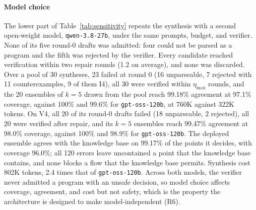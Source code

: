\documentclass[final,5p]{elsarticle}
\begin{document}
\paragraph{Model choice}
The lower part of Table~\ref{tab:sensitivity} repeats the synthesis with a second open-weight model, \texttt{qwen-3.8-27b}, under the same prompts, budget, and verifier. None of its five round-0 drafts was admitted: four could not be parsed as a program and the fifth was rejected by the verifier. Every candidate reached verification within two repair rounds (1.2 on average), and none was discarded. Over a pool of 30 syntheses, 23 failed at round 0 (16 unparseable, 7 rejected with 11 counterexamples, 9 of them I4), all 30 were verified within $\eta_{\max}$ rounds, and the 20 ensembles of $k=5$ drawn from the pool reach 99.18\% agreement at 97.1\% coverage, against 100\% and 99.6\% for \texttt{gpt-oss-120b}, at 760K against 322K tokens. On V4, all 20 of its round-0 drafts failed (18 unparseable, 2 rejected), all 20 were verified after repair, and its $k=5$ ensembles reach 99.47\% agreement at 98.0\% coverage, against 100\% and 98.9\% for \texttt{gpt-oss-120b}. The deployed ensemble agrees with the knowledge base on 99.17\% of the points it decides, with coverage 96.0\%; all 120 errors leave uncontained a point that the knowledge base contains, and none blocks a flow that the knowledge base permits. Synthesis cost 802K tokens, 2.4 times that of \texttt{gpt-oss-120b}. Across both models, the verifier never admitted a program with an unsafe decision, so model choice affects coverage, agreement, and cost but not safety, which is the property the architecture is designed to make model-independent (R6).
\end{document}
